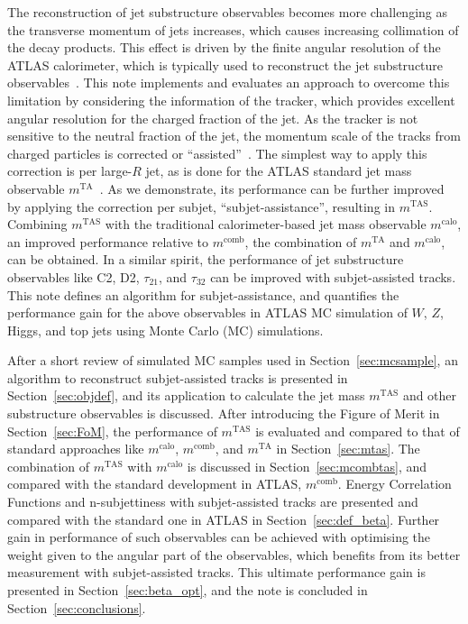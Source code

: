 \documentclass[UKenglish,texlive=2013]{\ATLASLATEXPATH atlasdoc}
\newcommand{\mta}{\ensuremath{m^\textrm{TA}}\xspace}
\newcommand{\mtas}{\ensuremath{m^\textrm{TAS}}\xspace}
\newcommand{\mcalo}{\ensuremath{m^\textrm{calo}}\xspace}
\newcommand{\mcomb}{\ensuremath{m^\textrm{comb}}\xspace}
\begin{document}
The reconstruction of jet substructure observables becomes more challenging as the transverse momentum of jets increases, which causes increasing collimation of the decay products. This effect is driven by the finite angular resolution of the ATLAS calorimeter, which is typically used to reconstruct the jet substructure observables~\cite{art35}. This note implements and evaluates an approach to overcome this limitation by considering the information of the tracker, which provides excellent angular resolution for the charged fraction of the jet. As the tracker is not sensitive to the neutral fraction of the jet, the momentum scale of the tracks from charged particles is corrected or ``assisted''~\cite{bib:schaetzel,bib:tweedie}. The simplest way to apply this correction is per large-$R$ jet, as is done for the ATLAS standard jet mass observable \mta~\cite{art35}. As we demonstrate, its performance can be further improved by applying the correction per subjet, ``subjet-assistance'', resulting in \mtas. Combining \mtas with the traditional calorimeter-based jet mass observable \mcalo, an improved performance relative to \mcomb, the combination of \mta and \mcalo, can be obtained.
In a similar spirit, the performance of jet substructure observables like C2, D2, $\tau_{21}$, and $\tau_{32}$ can be improved with subjet-assisted tracks. This note defines an algorithm for subjet-assistance, and quantifies the performance gain for the above observables in ATLAS MC simulation of $W$, $Z$, Higgs, and top jets using Monte Carlo (MC) simulations. 

After a short review of simulated MC samples used in Section~\ref{sec:mcsample}, an algorithm to reconstruct subjet-assisted tracks is presented in Section~\ref{sec:objdef}, and its application to calculate the jet mass \mtas and other substructure observables is discussed. After introducing the Figure of Merit in Section~\ref{sec:FoM}, the performance of \mtas is evaluated and compared to that of standard approaches like \mcalo, \mcomb, and \mta in Section~\ref{sec:mtas}. The combination of \mtas with \mcalo is discussed in Section~\ref{sec:mcombtas}, and compared with the standard development in ATLAS, \mcomb. Energy Correlation Functions and n-subjettiness with subjet-assisted tracks are presented and compared with the standard one in ATLAS in Section~\ref{sec:def_beta}. Further gain in performance of such observables can be achieved with optimising the weight given to the angular part of the observables, which benefits from its better measurement with subjet-assisted tracks. This ultimate performance gain is presented in Section~\ref{sec:beta_opt}, and the note is concluded in Section~\ref{sec:conclusions}.
\end{document}
